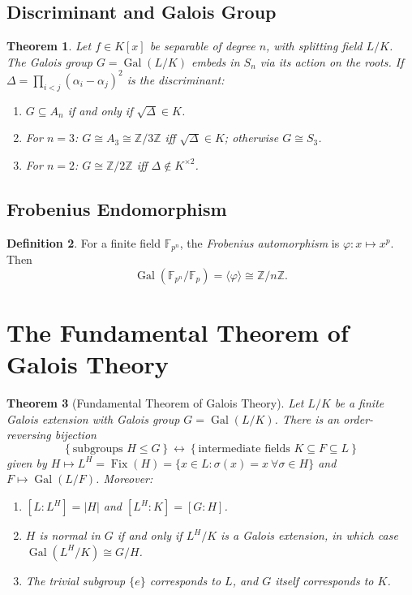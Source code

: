 \documentclass[12pt,a4paper]{amsart}
\newtheorem{theorem}{Theorem}[section]
\theoremstyle{definition}
\newtheorem{definition}[theorem]{Definition}
\newcommand{\Z}{\mathbb{Z}}
\newcommand{\F}{\mathbb{F}}
\newcommand{\Gal}{\operatorname{Gal}}
\newcommand{\Fix}{\operatorname{Fix}}
\begin{document}
\subsection{Discriminant and Galois Group}

\begin{theorem}
Let $f \in K[x]$ be separable of degree $n$, with splitting field $L/K$.
The Galois group $G = \Gal(L/K)$ embeds in $S_n$ via its action on the roots.
If $\Delta = \prod_{i < j}(\alpha_i - \alpha_j)^2$ is the discriminant:
\begin{enumerate}[label=(\roman*)]
  \item $G \subseteq A_n$ if and only if $\sqrt{\Delta} \in K$.
  \item For $n = 3$: $G \cong A_3 \cong \Z/3\Z$ iff $\sqrt{\Delta} \in K$;
        otherwise $G \cong S_3$.
  \item For $n = 2$: $G \cong \Z/2\Z$ iff $\Delta \notin K^{\times 2}$.
\end{enumerate}
\end{theorem}

\subsection{Frobenius Endomorphism}

\begin{definition}
For a finite field $\F_{p^n}$, the \emph{Frobenius automorphism}
is $\varphi: x \mapsto x^p$. Then
\[
  \Gal(\F_{p^n}/\F_p) = \langle \varphi \rangle \cong \Z/n\Z.
\]
\end{definition}

\section{The Fundamental Theorem of Galois Theory}

\begin{theorem}[Fundamental Theorem of Galois Theory]
\label{thm:ftgt}
Let $L/K$ be a finite Galois extension with Galois group $G = \Gal(L/K)$.
There is an order-reversing bijection
\[
  \left\{\text{subgroups } H \leq G\right\}
  \longleftrightarrow
  \left\{\text{intermediate fields } K \subseteq F \subseteq L\right\}
\]
given by $H \mapsto L^H = \Fix(H) = \{x \in L : \sigma(x) = x\ \forall \sigma \in H\}$
and $F \mapsto \Gal(L/F)$. Moreover:
\begin{enumerate}[label=(\roman*)]
  \item $[L:L^H] = |H|$ and $[L^H:K] = [G:H]$.
  \item $H$ is normal in $G$ if and only if $L^H/K$ is a Galois extension, in
        which case $\Gal(L^H/K) \cong G/H$.
  \item The trivial subgroup $\{e\}$ corresponds to $L$, and $G$ itself
        corresponds to $K$.
\end{enumerate}
\end{theorem}
\end{document}
